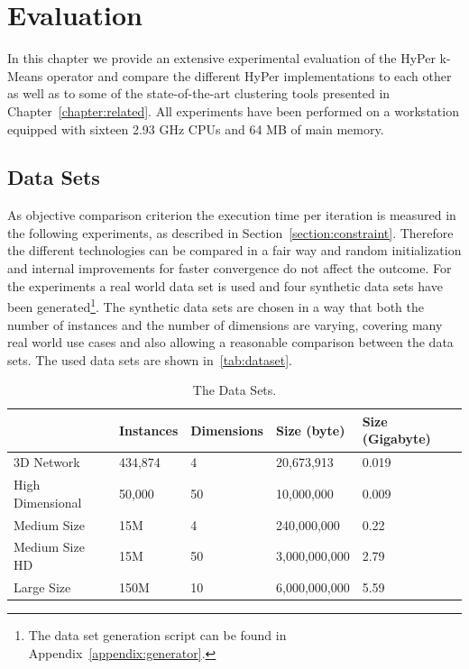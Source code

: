 \chapter{Evaluation}\label{chapter:evaluation}

In this chapter we provide an extensive experimental evaluation of the HyPer k-Means operator and compare the different HyPer implementations to each other as well as to some of the state-of-the-art clustering tools presented in Chapter~\ref{chapter:related}. All experiments have been performed on a workstation equipped with sixteen 2.93 GHz CPUs and 64 MB of main memory.


\section{Data Sets}
As objective comparison criterion the execution time per iteration is measured in the following experiments, as described in Section~\ref{section:constraint}. Therefore the different technologies can be compared in a fair way and random initialization and internal improvements for faster convergence do not affect the outcome. For the experiments a real world data set is used and four synthetic data sets have been generated\footnote{The data set generation script can be found in Appendix~\ref{appendix:generator}.}. The synthetic data sets are chosen in a way that both the number of instances and the number of dimensions are varying, covering many real world use cases and also allowing a reasonable comparison between the data sets. The used data sets are shown in~\autoref{tab:dataset}.

\begin{table}[htsb]
  \caption[The Data Sets]{The Data Sets.}\label{tab:dataset}
  \centering
  \begin{tabular}{l l l l l}
    \toprule
      & Instances & Dimensions & Size (byte) & Size (Gigabyte) \\
    \midrule
      3D Network        & 434,874    & 4     & 20,673,913 & 0.019 \\
      High Dimensional  & 50,000     & 50    & 10,000,000 & 0.009 \\
      Medium Size       & 15M       & 4     & 240,000,000 & 0.22 \\
      Medium Size HD    & 15M       & 50    & 3,000,000,000 & 2.79 \\
      Large Size        & 150M      & 10    & 6,000,000,000 & 5.59 \\
    \bottomrule
  \end{tabular}
\end{table}



